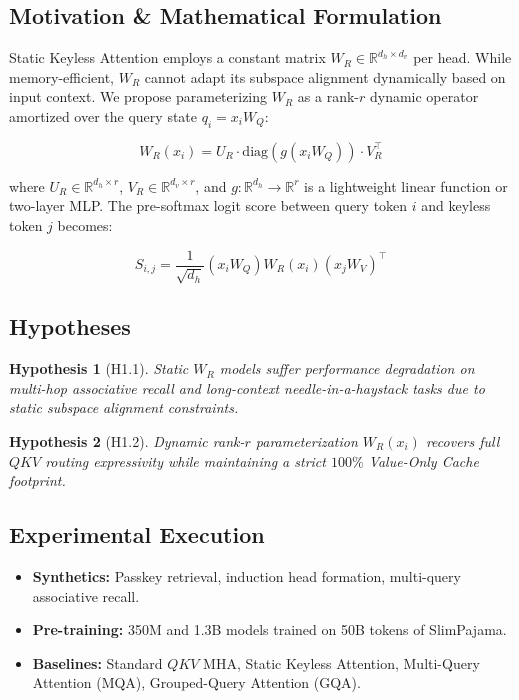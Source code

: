 \documentclass[11pt,a4paper]{article}
\newtheorem{hypothesis}{Hypothesis}
\begin{document}
\subsection{Motivation \& Mathematical Formulation}
Static Keyless Attention employs a constant matrix $W_R \in \mathbb{R}^{d_h \times d_v}$ per head. While memory-efficient, $W_R$ cannot adapt its subspace alignment dynamically based on input context. We propose parameterizing $W_R$ as a rank-$r$ dynamic operator amortized over the query state $q_i = x_i W_Q$:

\begin{equation}
W_R(x_i) = U_R \cdot \text{diag}\left(g(x_i W_Q)\right) \cdot V_R^\top
\end{equation}

where $U_R \in \mathbb{R}^{d_h \times r}$, $V_R \in \mathbb{R}^{d_v \times r}$, and $g: \mathbb{R}^{d_h} \to \mathbb{R}^r$ is a lightweight linear function or two-layer MLP. The pre-softmax logit score between query token $i$ and keyless token $j$ becomes:

\begin{equation}
S_{i,j} = \frac{1}{\sqrt{d_h}} \left( x_i W_Q \right) W_R(x_i) \left( x_j W_V \right)^\top
\end{equation}

\subsection{Hypotheses}
\begin{hypothesis}[H1.1]
Static $W_R$ models suffer performance degradation on multi-hop associative recall and long-context needle-in-a-haystack tasks due to static subspace alignment constraints.
\end{hypothesis}
\begin{hypothesis}[H1.2]
Dynamic rank-$r$ parameterization $W_R(x_i)$ recovers full $QKV$ routing expressivity while maintaining a strict $100\%$ Value-Only Cache footprint.
\end{hypothesis}

\subsection{Experimental Execution}
\begin{itemize}
    \item \textbf{Synthetics:} Passkey retrieval, induction head formation, multi-query associative recall.
    \item \textbf{Pre-training:} 350M and 1.3B models trained on 50B tokens of SlimPajama.
    \item \textbf{Baselines:} Standard $QKV$ MHA, Static Keyless Attention, Multi-Query Attention (MQA), Grouped-Query Attention (GQA).
\end{itemize}
\end{document}
